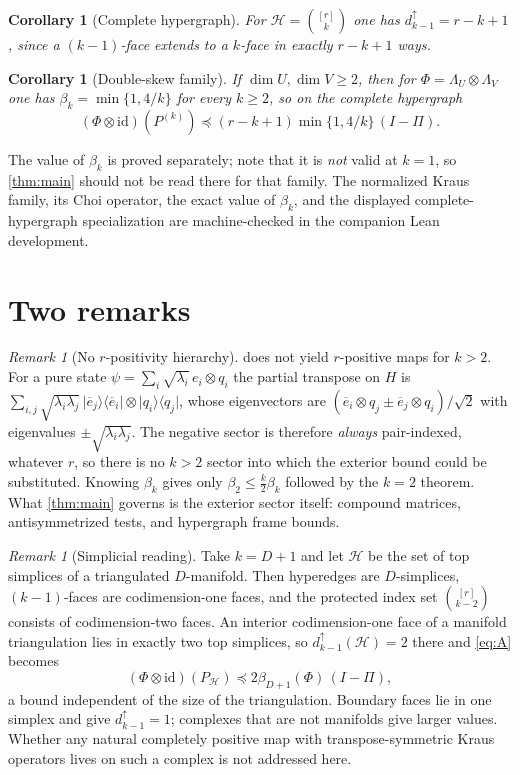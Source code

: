 \documentclass[11pt,reqno]{amsart}
\theoremstyle{plain}
\newtheorem{corollary}[theorem]{Corollary}
\theoremstyle{remark}
\newtheorem{remark}[theorem]{Remark}
\newcommand{\id}{\mathrm{id}}
\newcommand{\ketbra}[2]{\lvert #1\rangle\!\langle #2\rvert}
\begin{document}
\begin{corollary}[Complete hypergraph]
For $\mathcal H=\binom{[r]}k$ one has $d^\uparrow_{k-1}=r-k+1$, since a
$(k-1)$-face extends to a $k$-face in exactly $r-k+1$ ways.
\end{corollary}

\begin{corollary}[Double-skew family]
If $\dim U,\dim V\ge2$, then for
$\Phi=\Lambda_U\otimes\Lambda_V$ one has
$\beta_k=\min\{1,4/k\}$ for every $k\ge2$, so on the complete hypergraph
\[
    (\Phi\otimes\id)(P^{(k)})
    \preceq
    (r-k+1)\min\{1,4/k\}\,(I-\Pi).
\]
\end{corollary}

The value of $\beta_k$ is proved separately; note that it is \emph{not} valid at
$k=1$, so \cref{thm:main} should not be read there for that family.
The normalized Kraus family, its Choi operator, the exact value of $\beta_k$,
and the displayed complete-hypergraph specialization are machine-checked in
the companion Lean development.

\section{Two remarks}

\begin{remark}[No $r$-positivity hierarchy]
\label{rem:nohier}
 does not yield $r$-positive maps for $k>2$.  For a pure state
$\psi=\sum_i\sqrt{\lambda_i}\,e_i\otimes q_i$ the partial transpose on $H$ is
$\sum_{i,j}\sqrt{\lambda_i\lambda_j}\,\ketbra{\overline e_j}{\overline e_i}\otimes\ketbra{q_i}{q_j}$,
whose eigenvectors are
$(\overline e_i\otimes q_j\pm\overline e_j\otimes q_i)/\sqrt2$ with eigenvalues
$\pm\sqrt{\lambda_i\lambda_j}$.  The negative sector is therefore
\emph{always} pair-indexed, whatever $r$, so there is no $k>2$ sector into which
the exterior bound could be substituted.  Knowing $\beta_k$ gives only
$\beta_2\le\frac k2\beta_k$ followed by the $k=2$ theorem.  What
\cref{thm:main} governs is the exterior sector itself: compound matrices,
antisymmetrized tests, and hypergraph frame bounds.
\end{remark}

\begin{remark}[Simplicial reading]
Take $k=D+1$ and let $\mathcal H$ be the set of top simplices of a triangulated
$D$-manifold.  Then hyperedges are $D$-simplices, $(k-1)$-faces are
codimension-one faces, and the protected index set $\binom{[r]}{k-2}$ consists
of codimension-two faces.  An interior codimension-one face of a manifold
triangulation lies in exactly two top simplices, so
$d^\uparrow_{k-1}(\mathcal H)=2$ there and \cref{eq:A} becomes
\[
    (\Phi\otimes\id)(P_{\mathcal H})\preceq2\beta_{D+1}(\Phi)\,(I-\Pi),
\]
a bound independent of the size of the triangulation.  Boundary faces lie in
one simplex and give $d^\uparrow_{k-1}=1$; complexes that are not manifolds give
larger values.  Whether any natural completely positive map with
transpose-symmetric Kraus operators lives on such a complex is not addressed
here.
\end{remark}
\end{document}
